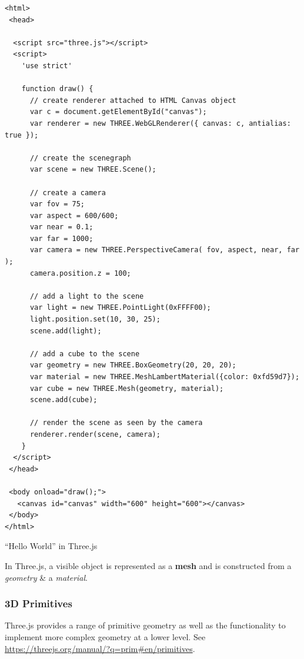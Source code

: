 \documentclass[a4paper,11pt]{article}
\newenvironment{code}{\captionsetup{type=listing}}{}
\begin{document}
\begin{code}
\begin{verbatim}
<html>
 <head>
  
  <script src="three.js"></script>
  <script>
    'use strict'

    function draw() {
      // create renderer attached to HTML Canvas object
      var c = document.getElementById("canvas");
      var renderer = new THREE.WebGLRenderer({ canvas: c, antialias: true });

      // create the scenegraph
      var scene = new THREE.Scene();

      // create a camera
      var fov = 75;
      var aspect = 600/600;
      var near = 0.1;
      var far = 1000;
      var camera = new THREE.PerspectiveCamera( fov, aspect, near, far );
      camera.position.z = 100;

      // add a light to the scene
      var light = new THREE.PointLight(0xFFFF00);
      light.position.set(10, 30, 25);
      scene.add(light);

      // add a cube to the scene
      var geometry = new THREE.BoxGeometry(20, 20, 20);
      var material = new THREE.MeshLambertMaterial({color: 0xfd59d7});
      var cube = new THREE.Mesh(geometry, material);
      scene.add(cube);

      // render the scene as seen by the camera
      renderer.render(scene, camera);
    }
  </script>
 </head>

 <body onload="draw();">
   <canvas id="canvas" width="600" height="600"></canvas>
 </body>
</html>
\end{verbatim}
\caption{``Hello World'' in Three.js}
\end{code}

In Three.js, a visible object is represented as a \textbf{mesh} and is constructed from a \textit{geometry} \& a
\textit{material}.

\subsubsection{3D Primitives}
Three.js provides a range of primitive geometry as well as the functionality to implement more complex geometry at a lower 
level.
See \url{https://threejs.org/manual/?q=prim#en/primitives}.
\end{document}
